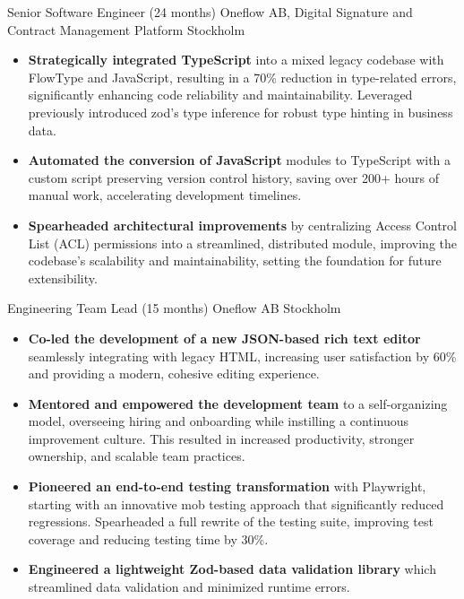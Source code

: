 {Senior Software Engineer (24 months)}
{Oneflow AB,  Digital Signature and Contract Management Platform}
{Stockholm \Large{}}{}
{
  \begin{itemize}[itemsep=0.07pt, topsep=0.5pt]
    \item \textbf{Strategically integrated TypeScript} into a mixed legacy codebase with FlowType and JavaScript, resulting in a 70\% reduction in type-related errors, significantly enhancing code reliability and maintainability.
    Leveraged previously introduced zod's type inference for robust type hinting in business data.
    \item \textbf{Automated the conversion of JavaScript} modules to TypeScript with a custom script preserving version control history, saving over 200+ hours of manual work, accelerating development timelines.
    \item \textbf{Spearheaded architectural improvements} by centralizing Access Control List (ACL) permissions into a streamlined, distributed module, improving the codebase’s scalability and maintainability, setting the foundation for future extensibility.
   \end{itemize}
}
{Engineering Team Lead (15 months)}
{Oneflow AB}
{Stockholm \Large{}}{}
{
  \begin{itemize}[itemsep=0.07pt, topsep=0.5pt]
    \item \textbf{Co-led the development of a new JSON-based rich text editor} seamlessly integrating with legacy HTML, increasing user satisfaction by 60\% and providing a modern, cohesive editing experience.
    \item \textbf{Mentored and empowered the development team} to a self-organizing model, overseeing hiring and onboarding while instilling a continuous improvement culture. This resulted in increased productivity, stronger ownership, and scalable team practices.
    \item \textbf{Pioneered an end-to-end testing transformation} with Playwright, starting with an innovative mob testing approach that significantly reduced regressions. Spearheaded a full rewrite of the testing suite, improving test coverage and reducing testing time by 30\%.
    \item \textbf{Engineered a lightweight Zod-based data validation library} which streamlined data validation and minimized runtime errors.
  \end{itemize}
}
